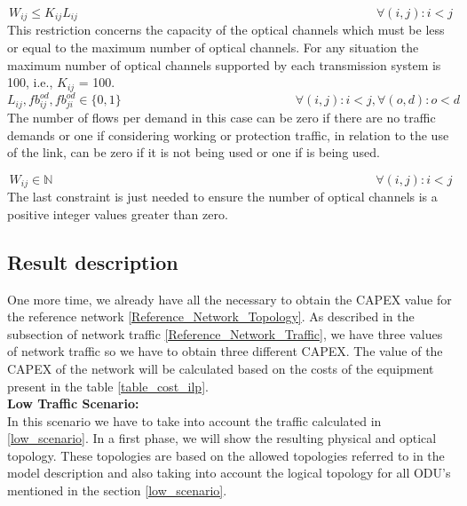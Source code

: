 \begin{equation}
W_{ij} \leq K_{ij} L_{ij} \qquad \qquad \qquad \qquad \qquad \qquad \qquad \qquad \qquad \qquad \qquad \qquad \forall(i,j) : i < j
\label{ILPOpaque5}
\end{equation}
\noindent
This restriction concerns the capacity of the optical channels which must be less or equal to the maximum number of optical channels. For any situation the maximum number of optical channels supported by each transmission system is 100, i.e., $K_{ij}$ = 100.
\newpage
\begin{equation}
L_{ij} , fb_{ij}^{od} , fb_{ji}^{od} \in \{0,1\} \qquad \qquad \qquad \qquad \qquad \qquad \qquad
\forall(i,j) : i < j, \forall(o,d) : o < d
\label{ILPOpaque6}
\end{equation}
\noindent
The number of flows per demand in this case can be zero if there are no traffic demands or one if considering working or protection traffic, in relation to the use of the link, can be zero if it is not being used or one if is being used.

\begin{equation}
W_{ij} \in \mathbb{N}  \qquad \qquad \qquad \qquad \qquad \qquad \qquad \qquad \qquad \qquad \qquad \qquad \qquad
\forall(i,j) : i < j\label{ILPOpaque7}
\end{equation}
\noindent
The last constraint is just needed to ensure the number of optical channels is a positive integer values greater than zero.\\

\subsection{Result description}

One more time, we already have all the necessary to obtain the CAPEX value for the reference network \ref{Reference_Network_Topology}. As described in the subsection of network traffic \ref{Reference_Network_Traffic}, we have three values of network traffic so we have to obtain three different CAPEX.
The value of the CAPEX of the network will be calculated based on the costs of the equipment present in the table \ref{table_cost_ilp}.\\

\textbf{Low Traffic Scenario:}\\

In this scenario we have to take into account the traffic calculated in \ref{low_scenario}. In a first phase, we will show the resulting physical and optical topology. These topologies are based on the allowed topologies referred to in the model description and also taking into account the logical topology for all ODU's mentioned in the section \ref{low_scenario}.

